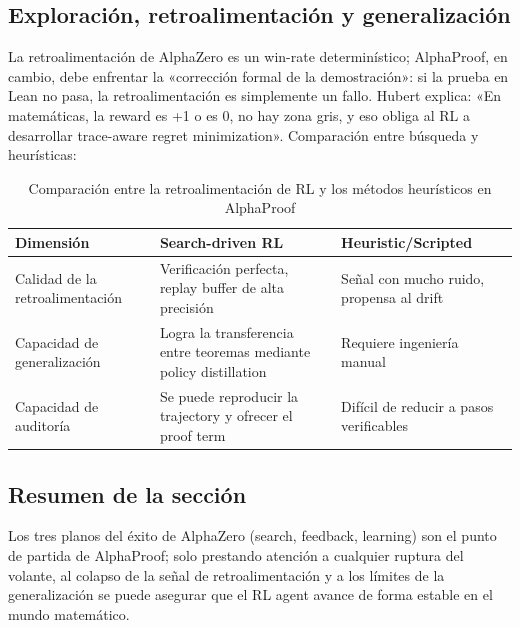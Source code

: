 \subsection{Exploración, retroalimentación y generalización}
La retroalimentación de AlphaZero es un win-rate determinístico; AlphaProof, en cambio, debe enfrentar la «corrección formal de la demostración»: si la prueba en Lean no pasa, la retroalimentación es simplemente un fallo. Hubert explica: «En matemáticas, la reward es +1 o es 0, no hay zona gris, y eso obliga al RL a desarrollar trace-aware regret minimization». Comparación entre búsqueda y heurísticas:
\begin{table}[H]
\centering
\begin{tabular}{p{4cm}p{4cm}p{4cm}}
\toprule
Dimensión & Search-driven RL & Heuristic/Scripted \\
\midrule
Calidad de la retroalimentación & Verificación perfecta, replay buffer de alta precisión & Señal con mucho ruido, propensa al drift \\
Capacidad de generalización & Logra la transferencia entre teoremas mediante policy distillation & Requiere ingeniería manual \\
Capacidad de auditoría & Se puede reproducir la trajectory y ofrecer el proof term & Difícil de reducir a pasos verificables \\
\bottomrule
\end{tabular}
\caption{Comparación entre la retroalimentación de RL y los métodos heurísticos en AlphaProof}
\end{table}

\subsection{Resumen de la sección}
Los tres planos del éxito de AlphaZero (search, feedback, learning) son el punto de partida de AlphaProof; solo prestando atención a cualquier ruptura del volante, al colapso de la señal de retroalimentación y a los límites de la generalización se puede asegurar que el RL agent avance de forma estable en el mundo matemático.
\newpage

